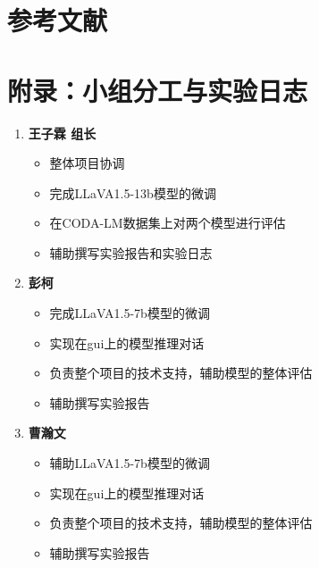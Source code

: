 \documentclass[
    linespread = 1.25
]{ctexart}
\begin{document}
\section*{参考文献}
\printbibliography[heading=none]




\newpage
\section*{附录：小组分工与实验日志}

\begin{enumerate}
  \item \textbf{王子霖 组长}
        \begin{itemize}
          \item 整体项目协调
          \item 完成LLaVA1.5-13b模型的微调
          \item 在CODA-LM数据集上对两个模型进行评估
          \item 辅助撰写实验报告和实验日志
        \end{itemize}

  \item \textbf{彭柯}
        \begin{itemize}
          \item 完成LLaVA1.5-7b模型的微调
          \item 实现在gui上的模型推理对话
          \item 负责整个项目的技术支持，辅助模型的整体评估
          \item 辅助撰写实验报告
        \end{itemize}

  \item \textbf{曹瀚文}
        \begin{itemize}
          \item 辅助LLaVA1.5-7b模型的微调
          \item 实现在gui上的模型推理对话
          \item 负责整个项目的技术支持，辅助模型的整体评估
          \item 辅助撰写实验报告
        \end{itemize}

\end{enumerate}
\end{document}
